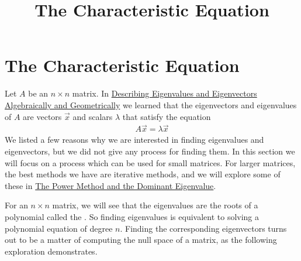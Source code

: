 \documentclass{ximera}
\title{The Characteristic Equation} \license{CC BY-NC-SA 4.0}
\begin{document}
\begin{abstract}

\end{abstract}
\maketitle
\section*{The Characteristic Equation}
Let $A$ be an $n \times n$ matrix.  In \href{https://ximera.osu.edu/oerlinalg/LinearAlgebra/EIG-0010/main}{Describing Eigenvalues and Eigenvectors Algebraically and Geometrically} we learned that the eigenvectors and eigenvalues of $A$ are vectors $\vec{x}$ and scalars $\lambda$ that satisfy the equation  
\begin{align}\label{def:eigen} A \vec{x} = \lambda \vec{x}\end{align}
We listed a few reasons why we are interested in finding eigenvalues and eigenvectors, but we did not give any process for finding them.  In this section we will focus on a process which can be used for small matrices.  For larger matrices, the best methods we have are iterative methods, and we will explore some of these in \href{https://ximera.osu.edu/oerlinalg/LinearAlgebra/EIG-0070/main}{The Power Method and the Dominant Eigenvalue}.

For an $n \times n$ matrix, we will see that the eigenvalues are the roots of a polynomial called the .  So finding eigenvalues is equivalent to solving a polynomial equation of degree $n$.  Finding the corresponding eigenvectors turns out to be a matter of computing the null space of a matrix, as the following exploration demonstrates.
\end{document}
